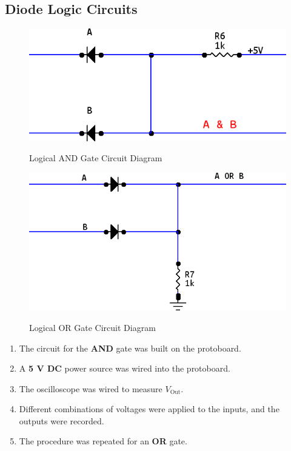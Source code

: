 \documentclass[twocolumn,english]{IEEEtran}
\begin{document}
\subsection{Diode Logic Circuits}
\begin{figure}[h!]
  \begin{centering}
  \begin{center}
  \includegraphics[width=\linewidth]{./and_gate.png}
  \label{fig:and_gate_diagram}
  \caption{Logical AND Gate Circuit Diagram}
  \end{center}
  \par\end{centering}
  \end{figure}

  \begin{figure}[h!]
  \begin{centering}
  \begin{center}
  \includegraphics[width=\linewidth]{./or_gate.png}
  \label{fig:or_gate_diagram}
  \caption{Logical OR Gate Circuit Diagram}
  \end{center}
  \par\end{centering}
  \end{figure}

  \begin{enumerate}
   \item The circuit for the \textbf{AND} gate was built on the protoboard.
   \item A \textbf{5 V DC} power source was wired into the protoboard.
   \item The oscilloscope was wired to measure $V_{\text{Out}}$.
   \item Different combinations of voltages were applied to the inputs, and the outputs were recorded.
   \item The procedure was repeated for an \textbf{OR} gate.
  \end{enumerate}
\end{document}
